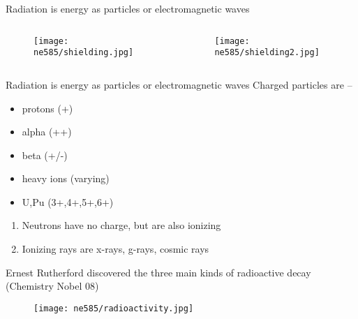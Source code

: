 \documentclass[aspectratio=1610,pdftex,dvipsnames,compress,xcolor={dvipsnames}]{beamer}
\begin{document}
\begin{frame}{Radiation is energy as particles or electromagnetic waves}
    \begin{columns}

        \begin{column}{0.50\textwidth}
            \begin{figure}
                \centering
                \texttt{[image: ne585/shielding.jpg]}
            \end{figure}
        \end{column}

        \begin{column}{0.50\textwidth}
            \begin{figure}
                \centering
                \texttt{[image: ne585/shielding2.jpg]}
            \end{figure}
        \end{column}

    \end{columns}
\end{frame}


\begin{frame}{Radiation is energy as particles or electromagnetic waves}
    Charged particles are --
    \begin{itemize}[series=outerlist,topsep=0pt,itemsep=5pt]
        \item protons (+)
        \item alpha (++)
        \item beta (+/-)
        \item heavy ions (varying)
        \item U,Pu (3+,4+,5+,6+)
    \end{itemize}

    \vspace*{\fill}

    \begin{enumerate}[series=outerlist,topsep=0pt,itemsep=21pt,leftmargin=*,label=(\arabic*)]
        \item[]Neutrons have no charge, but are also ionizing
        \item[]Ionizing rays are x-rays, g-rays, cosmic rays
    \end{enumerate}
\end{frame}


\begin{frame}{Ernest Rutherford discovered the three main kinds of radioactive decay (Chemistry Nobel 08)}
    \begin{figure}
        \centering
        \texttt{[image: ne585/radioactivity.jpg]}
    \end{figure}
\end{frame}
\end{document}
